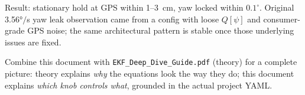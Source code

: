 \documentclass[11pt,a4paper]{article}
\begin{document}
Result: stationary hold at GPS within 1--3~cm, yaw locked within $0.1^\circ$. Original 3.56$°/$s yaw leak observation came from a config with loose $Q[\psi]$ and consumer-grade GPS noise; the same architectural pattern is stable once those underlying issues are fixed.

Combine this document with \texttt{EKF\_Deep\_Dive\_Guide.pdf} (theory) for a complete picture: theory explains \emph{why} the equations look the way they do; this document explains \emph{which knob controls what}, grounded in the actual project YAML.
\end{document}
